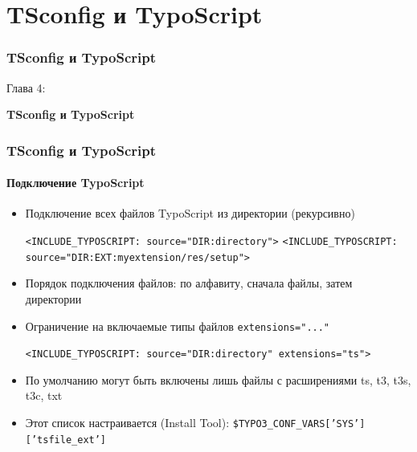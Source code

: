 %

\section{TSconfig и TypoScript}
\begin{frame}[fragile]
	\frametitle{TSconfig и TypoScript}

	\begin{center}\huge{Глава 4:}\end{center}
	\begin{center}\huge{\color{typo3darkgrey}\textbf{TSconfig и TypoScript}}\end{center}

\end{frame}


\begin{frame}[fragile]
	\frametitle{TSconfig и TypoScript}
	\framesubtitle{Подключение TypoScript}

	\begin{itemize}
		\item Подключение всех файлов TypoScript из директории (рекурсивно)

			\lstinline!<INCLUDE_TYPOSCRIPT: source="DIR:directory">!
			\lstinline!<INCLUDE_TYPOSCRIPT: source="DIR:EXT:myextension/res/setup">!

		\item Порядок подключения файлов:\newline
			по алфавиту, сначала файлы, затем директории
		\item Ограничение на включаемые типы файлов \texttt{extensions="..."}

			\lstinline!<INCLUDE_TYPOSCRIPT: source="DIR:directory" extensions="ts">!

		\item По умолчанию могут быть включены лишь файлы с расширениями ts, t3, t3s, t3c, txt
		\item Этот список настраивается (Install Tool):\newline
			\texttt{\$TYPO3\_CONF\_VARS['SYS']['tsfile\_ext']}
	\end{itemize}

\end{frame}

